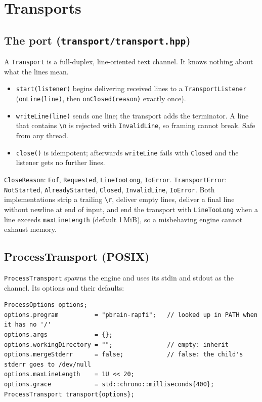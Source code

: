 \documentclass[11pt,a4paper]{article}
\newcommand{\code}[1]{\texttt{#1}}
\newcommand{\file}[1]{\texttt{#1}}
\begin{document}
\section{Transports}

\subsection{The port (\file{transport/transport.hpp})}

A \code{Transport} is a full-duplex, line-oriented text channel. It knows nothing about what the
lines mean.

\begin{itemize}
  \item \code{start(listener)} begins delivering received lines to a \code{TransportListener}
        (\code{onLine(line)}, then \code{onClosed(reason)} exactly once).
  \item \code{writeLine(line)} sends one line; the transport adds the terminator. A line that
        contains \code{\textbackslash n} is rejected with \code{InvalidLine}, so framing cannot
        break. Safe from any thread.
  \item \code{close()} is idempotent; afterwards \code{writeLine} fails with \code{Closed} and the
        listener gets no further lines.
\end{itemize}

\noindent \code{CloseReason}: \code{Eof}, \code{Requested}, \code{LineTooLong}, \code{IoError}.
\code{TransportError}: \code{NotStarted}, \code{AlreadyStarted}, \code{Closed}, \code{InvalidLine},
\code{IoError}. Both implementations strip a trailing \code{\textbackslash r}, deliver empty
lines, deliver a final line without newline at end of input, and end the transport with
\code{LineTooLong} when a line exceeds \code{maxLineLength} (default 1\,MiB), so a misbehaving engine
cannot exhaust memory.

\subsection{ProcessTransport (POSIX)}

\code{ProcessTransport} spawns the engine and uses its stdin and stdout as the channel. Its
options and their defaults:

\begin{lstlisting}
ProcessOptions options;
options.program          = "pbrain-rapfi";   // looked up in PATH when it has no '/'
options.args             = {};
options.workingDirectory = "";               // empty: inherit
options.mergeStderr      = false;            // false: the child's stderr goes to /dev/null
options.maxLineLength    = 1U << 20;
options.grace            = std::chrono::milliseconds{400};
ProcessTransport transport{options};
\end{lstlisting}
\end{document}
